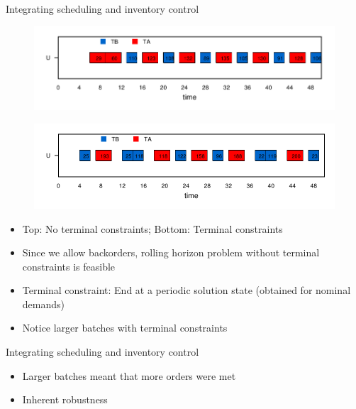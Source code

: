 \documentclass[table]{beamer}
\begin{document}
\begin{frame}{Integrating scheduling and inventory control}
\begin{figure}
\centering 
  \includegraphics[scale=0.5]{NTS_gantt.pdf}
\end{figure}
\begin{figure}
  \includegraphics[scale=0.5]{TS_gantt.pdf}
\end{figure}
\begin{itemize}
\item Top: No terminal constraints; Bottom: Terminal constraints
\item Since we allow backorders, rolling horizon problem without
  terminal constraints is feasible
\item Terminal constraint: End at a periodic solution state (obtained
  for nominal demands)
\item \alert{Notice} larger batches with terminal constraints
\end{itemize}
\end{frame}

\begin{frame}{Integrating scheduling and inventory control}
\begin{figure}
\centering 
\scriptsize
\resizebox{0.75\textwidth}{!}{}
\end{figure}
\begin{itemize}
\item Larger batches meant that \alert{more orders were met}
\item \alert{Inherent robustness}
\end{itemize}
\end{frame}
\end{document}
